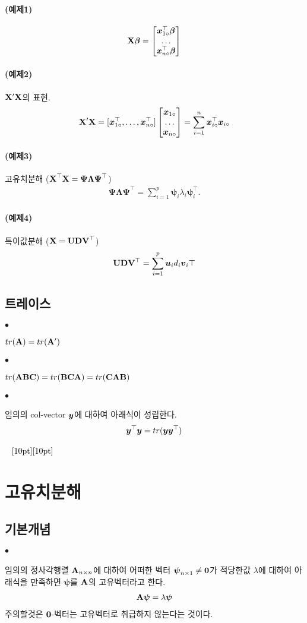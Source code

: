 \documentclass[12pt,oneside,english,a4paper]{article}
\newcommand{\dash}{\noindent \newline\textcolor{black}{\hrulefill~ \raisebox{-2.5pt}[10pt][10pt]{\leafright \decofourleft \decothreeleft  \aldineright \decotwo \floweroneleft \decoone   \floweroneright \decotwo \aldineleft\decothreeright \decofourright \leafleft} ~  \hrulefill}}
\def\ck{\paragraph{\Large$\bullet$}\Large}
\newcommand{\para}[1]{\paragraph{\Large(#1)}\Large}
\newcommand{\bs}[1]{\mbox{\boldmath $#1$}}
\newcommand{\bsu}{\mbox{\boldmath $u$}}
\newcommand{\bsv}{\mbox{\boldmath $v$}}
\newcommand{\bsx}{\mbox{\boldmath $x$}}
\newcommand{\bsy}{\mbox{\boldmath $y$}}
\newcommand{\bfD}{\mbox{$\bf{D}$}}
\newcommand{\bfU}{\mbox{$\bf{U}$}}
\newcommand{\bfV}{\mbox{$\bf{V}$}}
\newcommand{\bfX}{\mbox{$\bf{X}$}}
\begin{document}
\para{예제1}
\begin{align*}
{\bf X}{\bs{\beta}}=\begin{bmatrix}\bsx_{1\circ}^\top{\bs{\beta}} \\ \dots \\ \bsx_{n\circ}^\top {\bs{\beta}}\end{bmatrix}
\end{align*}

\para{예제2} ${\bf X}'{\bf X}$의 표현.
\begin{align*}
\bfX'\bfX = [\bsx_{1\circ}^\top,\dots, \bsx_{n\circ}^\top]\begin{bmatrix} \bsx_{1\circ} \\ \dots \\ \bsx_{n\circ} \end{bmatrix}=\sum_{i=1}^{n} \bsx_{i\circ}^\top \bsx_{i\circ}
\end{align*}

\para{예제3} 고유치분해 ($\bfX^\top\bfX = {\boldsymbol \Psi}{\boldsymbol\Lambda}{\boldsymbol\Psi}^\top$)
\begin{align*}
{\boldsymbol \Psi}{\boldsymbol\Lambda}{\boldsymbol\Psi}^\top= \sum_{i =1}^{p} \boldsymbol{\psi}_i \lambda_i  \boldsymbol{\psi}_i^\top.
\end{align*}


\para{예제4} 특이값분해 ($\bfX=\bfU\bfD\bfV^\top$)
\begin{align*}
{\bf U}{\bfD}{\bf V}^\top= \sum_{i =1}^{p} \bsu_i d_i \bsv_i\top
\end{align*}

\subsection{트레이스}

\ck $tr({\bf A})=tr({\bf A}')$

\ck $tr({\bf A}{\bf B}{\bf C})=tr({\bf B}{\bf C}{\bf A})=tr({\bf C}{\bf A}{\bf B})$

\ck 임의의 col-vector $\bsy$에 대하여 아래식이 성립한다. 
\begin{align*}
\bsy^\top\bsy=tr(\bsy\bsy^\top)
\end{align*}

\dash 

\section{고유치분해}
\subsection{기본개념}
\ck 임의의 정사각행렬 ${\bf A}_ {n \times n}$에 대하여 어떠한 벡터 ${\boldsymbol \psi}_ {n \times 1} \neq {\bf 0}$가 적당한값 $\lambda$에 대하여 아래식을 만족하면 $\boldsymbol \psi$를 $\bf A$의 고유벡터라고 한다. 
\begin{align*}
{\bf A}{\boldsymbol \psi}= \lambda {\boldsymbol \psi}
\end{align*}
주의할것은 $\bs{0}$-벡터는 고유벡터로 취급하지 않는다는 것이다. 
\end{document}
